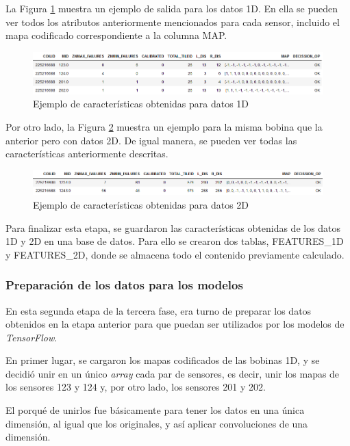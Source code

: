 La Figura \ref{f:fea1d} muestra un ejemplo de salida para los datos 1D. En ella se pueden ver todos los atributos anteriormente mencionados para cada sensor, incluido el mapa codificado correspondiente a la columna MAP. 

\begin{figure}[h]
 \centering
  \includegraphics[width=1\textwidth]{img/fea1D.PNG}
 \caption{Ejemplo de características obtenidas para datos 1D}
 \label{f:fea1d}
\end{figure}

Por otro lado, la Figura \ref{f:fea2d} muestra un ejemplo para la misma bobina que la anterior pero con datos 2D. De igual manera, se pueden ver todas las características anteriormente descritas.

\begin{figure}[h]
 \centering
  \includegraphics[width=1\textwidth]{img/fea2D.PNG}
 \caption{Ejemplo de características obtenidas para datos 2D}
 \label{f:fea2d}
\end{figure}

Para finalizar esta etapa, se guardaron las características obtenidas de los datos 1D y 2D en una base de datos. Para ello se crearon dos tablas, FEATURES\_1D y FEATURES\_2D, donde se almacena todo el contenido previamente calculado.

\subsubsection{Preparación de los datos para los modelos}
En esta segunda etapa de la tercera fase, era turno de preparar los datos obtenidos en la etapa anterior para que puedan ser utilizados por los modelos de \emph{TensorFlow}.

En primer lugar, se cargaron los mapas codificados de las bobinas 1D, y se decidió unir en un único \emph{array} cada par de sensores, es decir, unir los mapas de los sensores 123 y 124 y, por otro lado, los sensores 201 y 202.

El porqué de unirlos fue básicamente para tener los datos en una única dimensión, al igual que los originales, y así aplicar convoluciones de una dimensión. 

